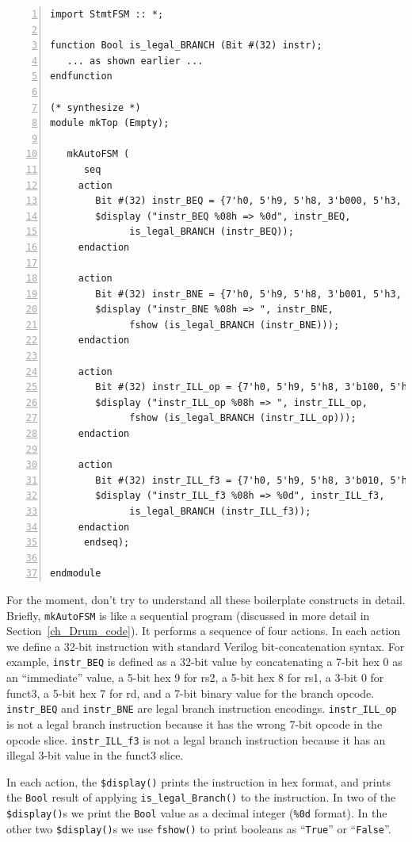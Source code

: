 \begin{minipage}{6.5in}\small
\begin{Verbatim}[frame=single, numbers=left]
import StmtFSM :: *;

function Bool is_legal_BRANCH (Bit #(32) instr);
   ... as shown earlier ...
endfunction

(* synthesize *)
module mkTop (Empty);

   mkAutoFSM (
      seq
	 action
	    Bit #(32) instr_BEQ = {7'h0, 5'h9, 5'h8, 3'b000, 5'h3, 7'b_110_0011};
	    $display ("instr_BEQ %08h => %0d", instr_BEQ,
		      is_legal_BRANCH (instr_BEQ));
	 endaction

	 action
	    Bit #(32) instr_BNE = {7'h0, 5'h9, 5'h8, 3'b001, 5'h3, 7'b_110_0011};
	    $display ("instr_BNE %08h => ", instr_BNE,
		      fshow (is_legal_BRANCH (instr_BNE)));
	 endaction

	 action
	    Bit #(32) instr_ILL_op = {7'h0, 5'h9, 5'h8, 3'b100, 5'h3, 7'b_110_0000};
	    $display ("instr_ILL_op %08h => ", instr_ILL_op,
		      fshow (is_legal_BRANCH (instr_ILL_op)));
	 endaction

	 action
	    Bit #(32) instr_ILL_f3 = {7'h0, 5'h9, 5'h8, 3'b010, 5'h3, 7'b_110_0011};
	    $display ("instr_ILL_f3 %08h => %0d", instr_ILL_f3,
		      is_legal_BRANCH (instr_ILL_f3));
	 endaction
      endseq);

endmodule
\end{Verbatim}
\end{minipage}

For the moment, don't try to understand all these boilerplate
constructs in detail.  Briefly, \verb|mkAutoFSM| is like a sequential
program (discussed in more detail in Section~\ref{ch_Drum_code}).  It
performs a sequence of four actions.  In each action we define a
32-bit instruction with standard Verilog bit-concatenation syntax.
For example, \verb|instr_BEQ| is defined as a 32-bit value by
concatenating a 7-bit hex 0 as an ``immediate'' value, a 5-bit hex 9
for rs2, a 5-bit hex 8 for rs1, a 3-bit 0 for funct3, a 5-bit hex 7
for rd, and a 7-bit binary value for the branch opcode.
\verb|instr_BEQ| and \verb|instr_BNE| are legal branch instruction
encodings.  \verb|instr_ILL_op| is not a legal branch instruction
because it has the wrong 7-bit opcode in the opcode slice.
\verb|instr_ILL_f3| is not a legal branch instruction because it has
an illegal 3-bit value in the funct3 slice.

In each action, the \verb|$display()| prints the instruction in hex
format, and prints the \verb|Bool| result of applying
\verb|is_legal_Branch()| to the instruction.  In two of the
\verb|$display()|s we print the \verb|Bool| value as a decimal integer
(\verb|%0d| format).  In the other two \verb|$display()|s we use
\verb|fshow()| to print booleans as ``\verb|True|'' or
``\verb|False|''.

